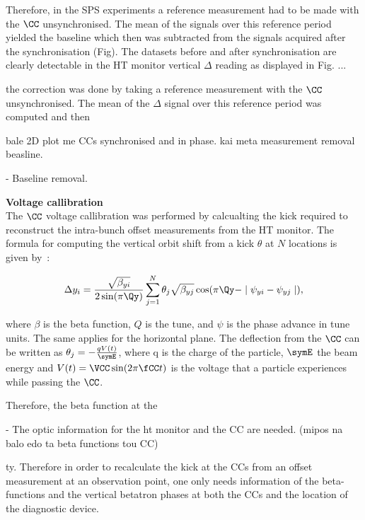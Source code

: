 Therefore, in the SPS experiments a reference measurement had to be made with the $\CC$ unsynchronised. The mean of the signals over this reference period yielded the baseline which then was subtracted from the signals acquired after the synchronisation (Fig). The datasets before and after synchronisation are clearly detectable in the HT monitor vertical $\Delta$ reading as displayed in Fig. ...







the correction was done by taking a reference measurement with the $\CC$ unsynchronised. The mean of the $\Delta$ signal over this reference period was computed and then



bale 2D plot me CCs synchronised and in phase. 
kai meta measurement removal beasline.

- Baseline removal. 






\normalsize{\textbf{Voltage callibration}}\\
The $\CC$ voltage callibration was performed by calcualting the kick required to reconstruct the intra-bunch offset measurements from the HT monitor. The formula for computing the vertical orbit shift from a kick $\theta$ at $N$ locations is given by~\cite{Carver:2696108, Chao:1490001}:

\begin{equation}
   \Delta y_i  = \frac{\sqrt{\beta_{yi}}}{2 \sin(\pi \Qy)} \sum_{j=1}^{N} \theta_j \sqrt{\beta_{yj}} \cos(\pi \Qy - \mid \psi_{yi} - \psi_{yj} \mid),
\end{equation}

where $\beta$ is the beta function, $Q$ is the tune, and $\psi$ is the phase advance in tune units. The same applies for the horizontal plane. The deflection from the $\CC$ can be written as $\theta_j = - \frac{q V(t)}{\symE}$, where q is the charge of the particle, $\symE$ the beam energy and $V(t) = \VCC \sin(2 \pi \fCC t) $ is the voltage that a particle experiences while passing the $\CC$. 




Therefore, the beta function at the 


- The optic information for the ht monitor and the CC are needed.  (mipos na balo edo ta beta functions tou CC)

ty. Therefore in order
to recalculate the kick at the CCs from an offset measurement at an observation point, one only needs information of
the beta-functions and the vertical betatron phases at both
the CCs and the location of the diagnostic device.


